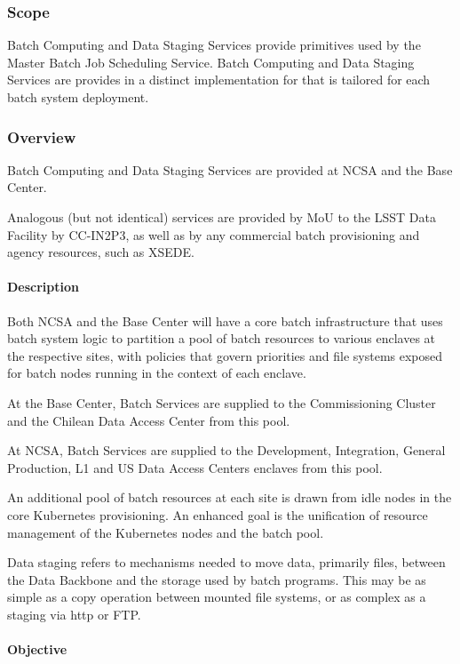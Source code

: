 ﻿\subsubsection{Scope}

Batch Computing and Data Staging Services provide primitives 
used by the Master Batch Job Scheduling Service. Batch Computing 
and Data Staging Services are provides in a distinct implementation 
for that is tailored for each batch system deployment.

\subsubsection{Overview}

Batch Computing and Data Staging Services are provided at NCSA and the Base Center.

Analogous (but not identical) services are provided by MoU to the LSST
Data Facility by CC-IN2P3, as well as by any commercial batch
provisioning and agency resources, such as XSEDE. 

\paragraph{Description}

Both NCSA and the Base Center will have a core batch infrastructure that
uses batch system logic to partition a pool of batch resources to
various enclaves at the respective sites, with policies that govern
priorities and file systems exposed for batch nodes running in the
context of each enclave.

At the Base Center, Batch Services are supplied to the Commissioning
Cluster and the Chilean Data Access Center from this pool.

At NCSA, Batch Services are supplied to the Development, Integration,
General Production, L1 and US Data Access Centers enclaves from this pool.

An additional pool of batch resources at each site is drawn from idle nodes
in the core Kubernetes provisioning. An enhanced goal is the unification of
resource management of the Kubernetes nodes and the batch pool.

Data staging refers to mechanisms needed to move data, primarily files, between the
Data Backbone and the storage used by batch programs. This may be as simple
as a copy operation between mounted file systems, or as complex as a staging
via http or FTP.

\paragraph{Objective}

